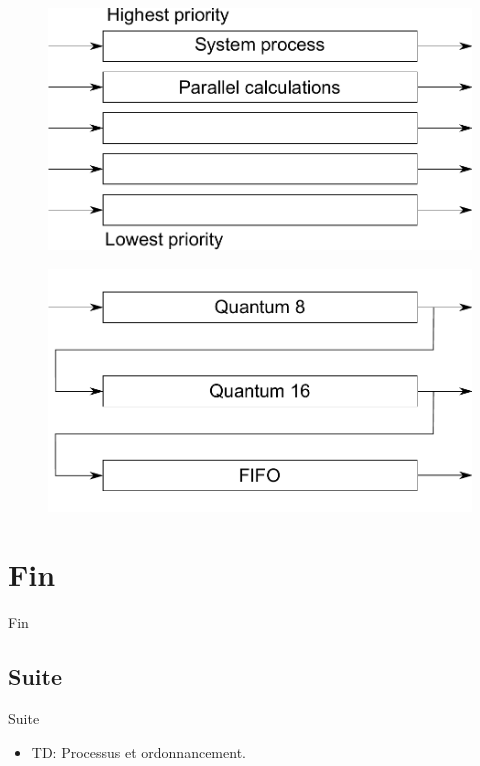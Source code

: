 \begin{frame}{\sectitle}
\begin{figure}

\includegraphics[width=\textwidth]{images/multipleFiles.pdf}
\end{figure}

\end{frame}


\begin{frame}{\sectitle}
\begin{figure}
\includegraphics[width=\textwidth]{images/multipleFilesQt.pdf}
\end{figure}




\end{frame}

\def\sectitle{Fin}
\section{\sectitle}

\begin{frame}{\sectitle}
\def\subsectitle{Suite}
\subsection{\subsectitle}

\begin{exampleblock}{\subsectitle}
\begin{itemize}
    \item TD: Processus et ordonnancement.
\end{itemize}
\end{exampleblock}

\end{frame}



